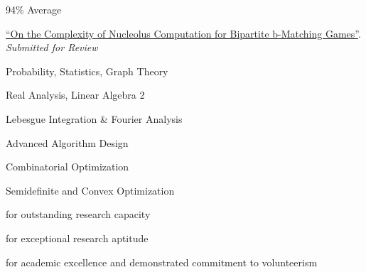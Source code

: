 \documentclass[11pt,a4paper,ragged2e]{altacv}
\begin{document}
\begin{paracol}{2}
94\% Average

\href{https://arxiv.org/abs/2105.07161}{\faExternalLink* ``On the Complexity of Nucleolus Computation for Bipartite b-Matching Games''}.
\emph{Submitted for Review}

Probability, Statistics, Graph Theory

\smallskip

Real Analysis, Linear Algebra 2

\smallskip

Lebesgue Integration \& Fourier Analysis

\divider\smallskip

Advanced Algorithm Design

\smallskip

Combinatorial Optimization

\smallskip

Semidefinite and Convex Optimization


for outstanding research capacity

\divider\smallskip

for exceptional research aptitude

\divider\smallskip

for academic excellence and demonstrated commitment to volunteerism

\iffalse
\divider\smallskip

\cvevent{President's Research Award (\$1500)}{}{September 2020}{}

\divider\smallskip

\cvevent{President's Scholarship of Distinction}{University of Waterloo}{September 2017}{}
for entrance average above 95\%
\fi

\end{paracol}
\end{document}
